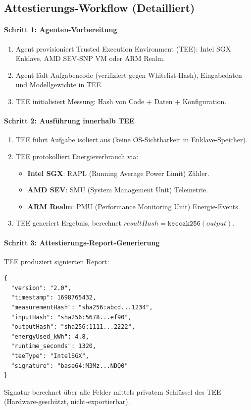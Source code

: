 \documentclass[11pt]{article}
\begin{document}
\subsection{Attestierungs-Workflow (Detailliert)}
\label{sec:attestation-workflow}
\paragraph{Schritt 1: Agenten-Vorbereitung}
\begin{enumerate}[noitemsep]
  \item Agent provisioniert Trusted Execution Environment (TEE): Intel SGX Enklave, AMD SEV-SNP VM oder ARM Realm.
  \item Agent lädt Aufgabencode (verifiziert gegen Whitelist-Hash), Eingabedaten und Modellgewichte in TEE.
  \item TEE initialisiert Messung: Hash von Code + Daten + Konfiguration.
\end{enumerate}

\paragraph{Schritt 2: Ausführung innerhalb TEE}
\begin{enumerate}[noitemsep]
  \item TEE führt Aufgabe isoliert aus (keine OS-Sichtbarkeit in Enklave-Speicher).
  \item TEE protokolliert Energieverbrauch via:
    \begin{itemize}[noitemsep]
      \item \textbf{Intel SGX}: RAPL (Running Average Power Limit) Zähler.
      \item \textbf{AMD SEV}: SMU (System Management Unit) Telemetrie.
      \item \textbf{ARM Realm}: PMU (Performance Monitoring Unit) Energie-Events.
    \end{itemize}
  \item TEE generiert Ergebnis, berechnet $resultHash = \texttt{keccak256}(output)$.
\end{enumerate}

\paragraph{Schritt 3: Attestierungs-Report-Generierung}
TEE produziert signierten Report:
\begin{verbatim}
{
  "version": "2.0",
  "timestamp": 1698765432,
  "measurementHash": "sha256:abcd...1234",
  "inputHash": "sha256:5678...ef90",
  "outputHash": "sha256:1111...2222",
  "energyUsed_kWh": 4.8,
  "runtime_seconds": 1320,
  "teeType": "IntelSGX",
  "signature": "base64:M3Mz...NDQ0"
}
\end{verbatim}
Signatur berechnet über alle Felder mittels privatem Schlüssel des TEE (Hardware-geschützt, nicht-exportierbar).
\end{document}

